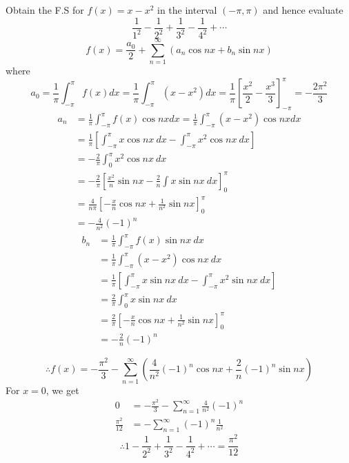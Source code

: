 \documentclass[12pt]{article}
\begin{document}
\begin{example}{Obtain the F.S for $f(x) = x - x^2$ in the interval $(-\pi, \pi)$ and hence evaluate \[
    \frac{1}{1^2} - \frac{1}{2^2} + \frac{1}{3^2} - \frac{1}{4^2} + \cdots
\]}{}
    \[
        f(x) = \frac{a_0}{2} + \sum_{n=1}^{\infty} \left( a_n \cos{nx} + b_n \sin{nx} \right)
    \] where \[
        a_0 = \frac{1}{\pi} \int_{-\pi}^{\pi} f(x) dx = \frac{1}{\pi} \int_{-\pi}^{\pi} (x - x^2) dx = \frac{1}{\pi} \left[ \frac{x^2}{2} - \frac{x^3}{3} \right]_{-\pi}^{\pi} = -\frac{2\pi^2}{3}
    \]
    \begin{align*}
        a_n &= \frac{1}{\pi} \int_{-\pi}^{\pi} f(x) \cos{nx} dx = \frac{1}{\pi} \int_{-\pi}^{\pi} (x - x^2) \cos{nx} dx \\
        &= \frac{1}{\pi} \left[ \int_{-\pi}^{\pi} {x \cos{nx}} \: d{x} - \int_{-\pi}^{\pi} {x^2 \cos{nx}} \: d{x} \right] \\
        &= -\frac{2}{\pi} \int_{0}^{\pi} {x^2 \cos{nx}} \: d{x} \\
        &= -\frac{2}{\pi} \left[ \frac{x^2}{n} \sin{nx} - \frac{2}{n} \int{x \sin{nx}} \: d{x} \right]_{0}^{\pi} \\
        &= \frac{4}{n\pi} \left[ -\frac{x}{n} \cos{nx} + \frac{1}{n^2} \sin{nx} \right]_{0}^{\pi} \\
        &= -\frac{4}{n^2} (-1)^{n}
    \end{align*}
    \begin{align*}
        b_n &= \frac{1}{\pi} \int_{-\pi}^{\pi} {f(x) \sin{nx}} \: d{x} \\
        &= \frac{1}{\pi} \int_{-\pi}^{\pi} {(x-x^2) \cos{nx}} \: d{x} \\
        &= \frac{1}{\pi} \left[ \int_{-\pi}^{\pi} {x \sin{nx}} \: d{x} - \int_{-\pi}^{\pi} {x^2 \sin{nx}} \: d{x} \right] \\
        &= \frac{2}{\pi} \int_{0}^{\pi} {x \sin{nx}} \: d{x} \\
        &= \frac{2}{\pi} \left[ -\frac{x}{n} \cos{nx} + \frac{1}{n^2} \sin{nx} \right]_{0}^{\pi} \\
        &= - \frac{2}{n} (-1)^{n}
    \end{align*}

    \[
        \therefore f(x) = -\frac{\pi^2}{3} - \sum_{n=1}^{\infty} \left( \frac{4}{n^2} (-1)^{n} \cos{nx} + \frac{2}{n} (-1)^{n} \sin{nx} \right)
    \]
    For $x=0$, we get
    \begin{align*}
        0 &= -\frac{\pi^2}{3} - \sum_{n=1}^{\infty} \frac{4}{n^2} (-1)^n \\
        \frac{\pi^2}{12} &= - \sum_{n=1}^{\infty} (-1)^n \frac{1}{n^2}
    \end{align*}
    \[
        \boxed{ \therefore 1 - \frac{1}{2^2} + \frac{1}{3^2} - \frac{1}{4^2} + \cdots = \frac{\pi^2}{12} }
    \]
\end{example}
\end{document}
